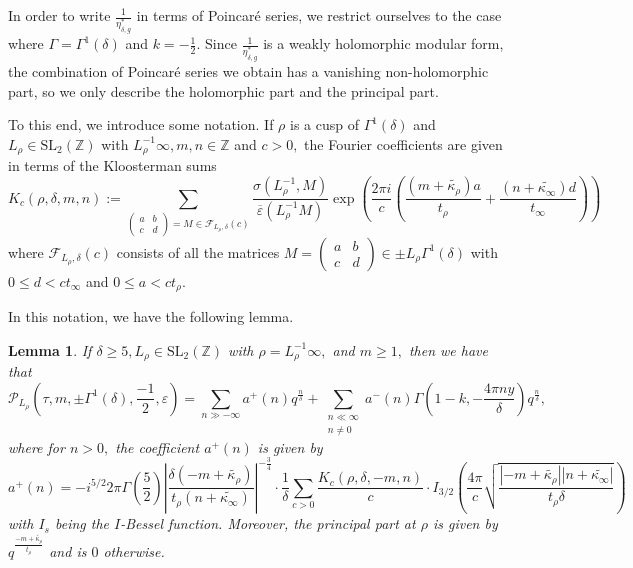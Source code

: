 \documentclass[10pt]{amsart}
\newtheorem{lemma}[theorem]{Lemma}
\theoremstyle{definition}
\theoremstyle{remark}
\numberwithin{equation}{section}
\newcommand{\SL}{\mathrm{SL}}
\newcommand{\Z}{\mathbb Z}
\begin{document}
	In order to write $\frac{1}{\eta_{\delta,g}^\ast}$ in terms of Poincar\'e series, we restrict ourselves to the case where $\Gamma=\Gamma^1(\delta)$ and $k=-\frac{1}{2}.$ Since $\frac{1}{\eta_{\delta,g}^\ast}$ is a weakly holomorphic modular form, the combination of Poincar\'e series we obtain has a vanishing non-holomorphic part, so we only describe the holomorphic part and the principal part. 
	
	To this end, we introduce some notation. 
	If $\rho$ is a cusp of $\Gamma^1(\delta)$ and $L_\rho\in\SL_2(\Z)$ with $L_\rho^{-1}\infty, m,n\in\Z $ and $c>0,$  the Fourier coefficients are given in terms of the Kloosterman sums
	$$
	K_c(\rho,\delta,m,n):=\sum\limits_{\begin{pmatrix}
			a & b \\ c & d
	\end{pmatrix}=M\in\mathcal{F}_{L_\rho,\delta}(c)} \frac{\sigma(L_\rho^{-1},M)}{\overline{\varepsilon}(L_\rho^{-1}M)}\exp\left(\frac{2\pi i}{c}\left(\frac{(m+\widetilde{\kappa_\rho})a}{t_\rho}+\frac{(n+\widetilde{\kappa_\infty})d}{t_\infty}\right)\right)
	$$
	where $\mathcal{F}_{L_\rho,\delta}(c)$ consists of all the matrices $M=\begin{pmatrix}
	a &  b \\
	c & d
	\end{pmatrix}\in \pm L_\rho\Gamma^1(\delta)$ with $0\leq d<ct_\infty$ and $0\leq a<ct_\rho.$ 
	
	In this notation, we have the following lemma.
	
	\begin{lemma}\label{lem:PoincareFourier}
		If $\delta\geq 5, L_\rho\in\SL_2(\Z)$ with $\rho=L_\rho^{-1}\infty,$ and $m\geq1,$ then we have that
		$$
		\mathcal{P}_{L_\rho}\left(\tau,m,\pm\Gamma^1(\delta),\frac{-1}{2},\varepsilon\right)=\sum\limits_{n\gg-\infty}a^{+}(n)q^{\frac{n}{\delta}}+\sum\limits_{\substack{n\ll\infty \\ n\neq 0}}a^{-}(n)\Gamma\left(1-k,-\frac{4\pi n y}{\delta}\right)q^\frac{n}{\delta},
		$$
		where for $n>0,$ the coefficient $a^+(n)$ is given by
		$$
		a^+(n)=-i^{5/2}2\pi\Gamma\left(\frac{5}{2}\right)\left|\frac{\delta(-m+\widetilde{\kappa_\rho})}{t_\rho(n+\widetilde{\kappa_\infty})}\right|^{-\frac{3}{4}}\cdot\frac{1}{\delta}\sum\limits_{c>0}\frac{K_c(\rho,\delta,-m,n)}{c}\cdot I_{3/2}\left(\frac{4\pi}{c}\sqrt{\frac{|-m+\widetilde{\kappa_\rho}||n+\widetilde{\kappa_\infty}|}{t_\rho \delta}}\right)
		$$
		with $I_{s}$ being the $I$-Bessel function. Moreover, the principal part at $\rho$ is given by $q^{\frac{-m+\widetilde{\kappa_\rho}}{t_\rho}}$ and is $0$ otherwise.
	\end{lemma}
	
\end{document}
